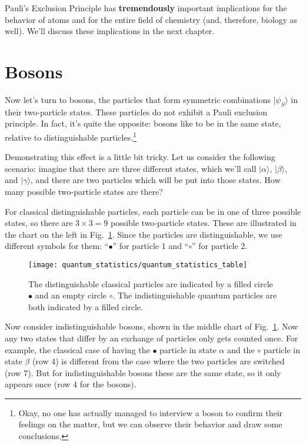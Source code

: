 Pauli's Exclusion Principle has {\bf tremendously} important implications
for the behavior of atoms and for the entire field of chemistry (and,
therefore, biology as well). We'll discuss these implications in the
next chapter.

\section{Bosons}
\label{sec:bosons}

Now let's turn to bosons, the particles that form symmetric
combinations $|\psi_S\rangle$ in their two-particle states.  These
particles do not exhibit a Pauli exclusion principle.  In fact, it's
quite the opposite: bosons like to be in the same state, relative to
distinguishable particles.\footnote{Okay, no one has actually managed
  to interview a boson to confirm their feelings on the matter, but we
  can observe their behavior and draw some conclusions.}

Demonstrating this effect is a little bit tricky.  Let us consider the
following scenario: imagine that there are three different states,
which we'll call $|\alpha\rangle$, $|\beta\rangle$, and
$|\gamma\rangle$, and there are two particles which will be put into
those states.  How many possible two-particle states are there?

For classical distinguishable particles, each particle can be in one
of three possible states, so there are $3\times 3=9$ possible
two-particle states.  These are illustrated in the chart on the left
in Fig.~\ref{fig:quantum_statistics}.  Since the particles are
distinguishable, we use different symbols for them: ``$\bullet$''
for particle 1 and ``$\circ$'' for particle 2.

\begin{figure}[h]
\begin{center}
\texttt{[image: quantum\_statistics/quantum\_statistics\_table]}
\caption{The distinguishable classical particles are indicated by a
  filled circle $\bullet$ and an empty circle $\circ$.  The
  indistinguishable quantum particles are both indicated by a filled
  circle.}
\label{fig:quantum_statistics}
\end{center}
\end{figure}

Now consider indistinguishable bosons, shown in the middle chart of
Fig.~\ref{fig:quantum_statistics}.  Now any two states that differ by
an exchange of particles only gets counted once.  For example, the
classical case of having the $\bullet$ particle in state $\alpha$ and
the $\circ$ particle in state $\beta$ (row 4) is different from the
case where the two particles are switched (row 7).  But for
indistinguishable bosons these are the same state, so it only appears
once (row 4 for the bosons).


